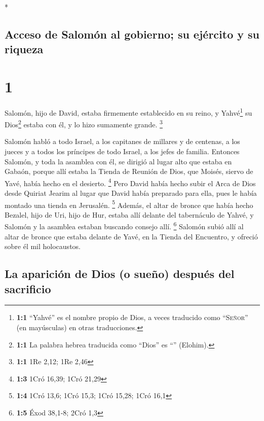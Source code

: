 \begin{paracol}{2} \switchcolumn[0]*

\hypertarget{acceso-de-salomuxf3n-al-gobierno-su-ejuxe9rcito-y-su-riqueza}{%
\subsection{Acceso de Salomón al gobierno; su ejército y su
riqueza}\label{acceso-de-salomuxf3n-al-gobierno-su-ejuxe9rcito-y-su-riqueza}}

\hypertarget{section}{%
\section{1}\label{section}}

 Salomón, hijo de David, estaba firmemente establecido en
su reino, y Yahvé\footnote{\textbf{1:1} ``Yahvé'' es el nombre propio de
  Dios, a veces traducido como ``\textsc{Señor}'' (en mayúsculas) en
  otras traducciones.} su Dios\footnote{\textbf{1:1} La palabra hebrea
  traducida como ``Dios'' es ``'' (Elohim).} estaba con
él, y lo hizo sumamente grande. \footnote{\textbf{1:1} 1Re 2,12; 1Re
  2,46}

 Salomón habló a todo Israel, a los capitanes de millares
y de centenas, a los jueces y a todos los príncipes de todo Israel, a
los jefes de familia.  Entonces Salomón, y toda la
asamblea con él, se dirigió al lugar alto que estaba en Gabaón, porque
allí estaba la Tienda de Reunión de Dios, que Moisés, siervo de Yavé,
había hecho en el desierto. \footnote{\textbf{1:3} 1Cró 16,39; 1Cró
  21,29}  Pero David había hecho subir el Arca de Dios
desde Quiriat Jearim al lugar que David había preparado para ella, pues
le había montado una tienda en Jerusalén. \footnote{\textbf{1:4} 1Cró
  13,6; 1Cró 15,3; 1Cró 15,28; 1Cró 16,1}  Además, el
altar de bronce que había hecho Bezalel, hijo de Uri, hijo de Hur,
estaba allí delante del tabernáculo de Yahvé, y Salomón y la asamblea
estaban buscando consejo allí. \footnote{\textbf{1:5} Éxod 38,1-8; 2Cró
  1,3}  Salomón subió allí al altar de bronce que estaba
delante de Yavé, en la Tienda del Encuentro, y ofreció sobre él mil
holocaustos.

\hypertarget{la-apariciuxf3n-de-dios-o-sueuxf1o-despuuxe9s-del-sacrificio}{%
\subsection{La aparición de Dios (o sueño) después del
sacrificio}\label{la-apariciuxf3n-de-dios-o-sueuxf1o-despuuxe9s-del-sacrificio}}


\end{paracol}
